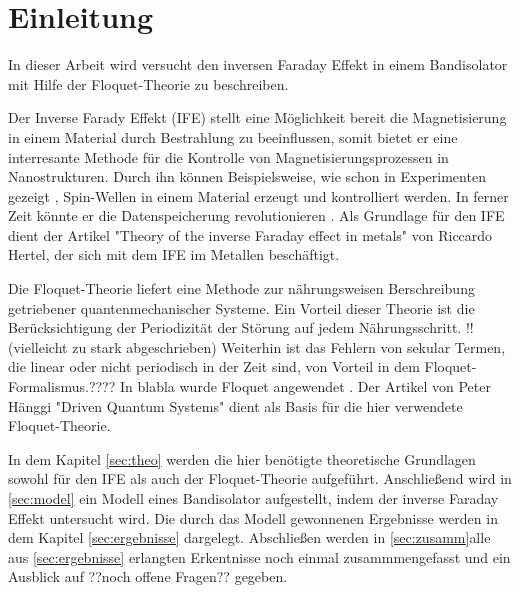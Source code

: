 \chapter{Einleitung}
In dieser Arbeit wird versucht
den inversen Faraday Effekt
in einem Bandisolator mit
Hilfe der Floquet-Theorie
zu beschreiben.

Der Inverse Farady Effekt (IFE) stellt eine Möglichkeit bereit
die Magnetisierung in einem Material
durch Bestrahlung zu beeinflussen,
somit bietet er eine interresante Methode für die
Kontrolle von Magnetisierungsprozessen in Nanostrukturen.
Durch ihn können Beispielsweise, wie schon
in Experimenten gezeigt \cite{E2},
Spin-Wellen in einem Material erzeugt und kontrolliert werden.
In ferner Zeit könnte er die
Datenspeicherung revolutionieren \cite{hertel}.
Als Grundlage für den IFE dient der Artikel
"Theory of the inverse Faraday effect
 in metals" \cite{hertel} von Riccardo
Hertel, der sich mit dem IFE im Metallen
beschäftigt.

Die Floquet-Theorie liefert eine Methode
zur nährungsweisen Berschreibung
getriebener quantenmechanischer Systeme.
Ein Vorteil dieser Theorie ist
die Berücksichtigung der Periodizität
der Störung auf jedem Nährungsschritt.
!!(vielleicht zu stark abgeschrieben)
Weiterhin ist das Fehlern von
sekular Termen, die linear oder nicht
periodisch in der Zeit sind, von Vorteil
in dem Floquet-Formalismus.??\cite{haggi}??
In blabla wurde Floquet angewendet .
Der Artikel von Peter Hänggi
"Driven Quantum Systems" \cite{haggi}
dient als Basis für die hier verwendete Floquet-Theorie.


In dem Kapitel \ref{sec:theo} werden die hier benötigte
theoretische Grundlagen sowohl für den IFE als auch der Floquet-Theorie aufgeführt.
Anschließend wird in \ref{sec:model} ein Modell eines Bandisolator aufgestellt,
indem der inverse Faraday Effekt untersucht wird.
Die durch das Modell gewonnenen Ergebnisse werden in dem Kapitel \ref{sec:ergebnisse} dargelegt.
Abschließen werden in \ref{sec:zusamm}alle aus \ref{sec:ergebnisse} erlangten Erkentnisse noch einmal zusammmengefasst und ein Ausblick
auf ??noch offene Fragen?? gegeben.







